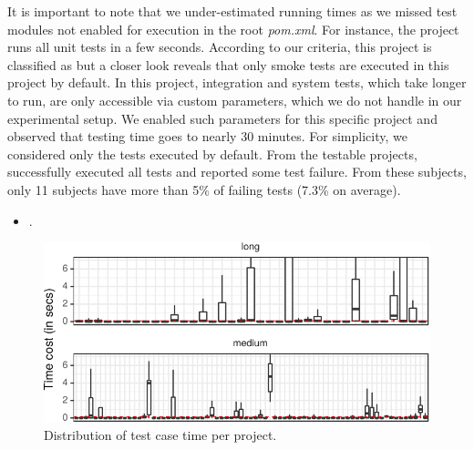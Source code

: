 It is important to note that we under-estimated running times as we missed test modules not enabled for
execution in the root \emph{pom.xml}. For instance, the project 
runs all unit tests in a few seconds.  According to our criteria, this
project is classified as \shortg{} but a closer look reveals
that only smoke tests are executed in this project by default.
In this project, integration and system tests, which take longer to run, are only accessible via
custom parameters, which we do not handle in our experimental setup.
We enabled such parameters for this specific project and observed that
testing time goes to nearly 30 minutes.  For simplicity, we considered
only the tests executed by default.
From the \numSubjs{} testable projects, \numSubjsPass{} successfully
executed all tests and \numSubjsFail{} reported some test failure.
From these \numSubjsFail{} subjects, only 11 subjects
have more than 5\% of failing tests (7.3\% on average).
\begin{center}
\end{center}

\begin{itemize}
  \item \numRQFeasibilityTwo. \textbf{\RQFeasibilityTwo}
\end{itemize}

\begin{figure}[t!]
  \centering
  \includegraphics[width=.48\textwidth]{results/testcost-distribution.pdf}
  \caption{\label{fig:time-distributions}Distribution of test case time per project.}%
  \vspace{-5mm}
\end{figure}

